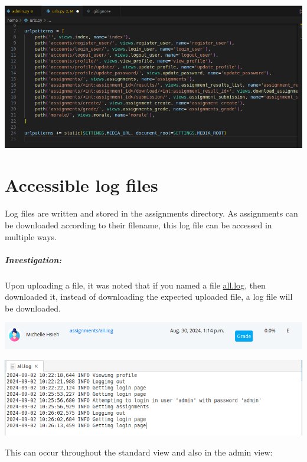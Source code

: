 \begin{center}
    \includegraphics[width = \linewidth]{images/Michelle/media_fix.png}
\end{center}


\section{Accessible log files}

Log files are written and stored in the assignments directory. As assignments can be downloaded according to their filename, this log file can be accessed in multiple ways.

\subparagraph{Investigation:}

Upon uploading a file, it was noted that if you named a file \url{all.log}, then downloaded it, instead of downloading the expected uploaded file, a log file will be downloaded.

\begin{center}
    \includegraphics[width = \linewidth]{images/Michelle/logdownload.png}
\end{center}

\begin{center}
    \includegraphics[width = \linewidth]{images/Michelle/logfile.png}
\end{center}

This can occur throughout the standard view and also in the admin view:

